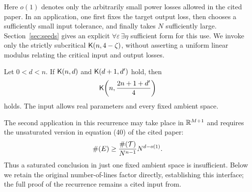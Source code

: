 Here $o(1)$ denotes only the arbitrarily small power losses allowed in the cited paper.
In an application, one first fixes the target output loss, then chooses a sufficiently small input tolerance, and finally takes $N$ sufficiently large.
Section~\ref{sec:seeds} gives an explicit $\forall\varepsilon\,\exists\eta$ sufficient form for this use.
We invoke only the strictly subcritical $\mathsf K(n,4-\zeta)$, without asserting a uniform linear modulus relating the critical input and output losses.

\begin{inputthm}\label{input:KT}
Let $0<d<n$. If $\mathsf K(n,d)$ and $\mathsf K(d+1,d')$ hold, then
\begin{equation}\label{eq:KT}
  \mathsf K\!\left(n,\frac{2n+1+d'}4\right)
\end{equation}
holds. The input allows real parameters and every fixed ambient space.
\end{inputthm}

The second application in this recurrence may take place in $\mathbb R^{M+1}$ and requires the unsaturated version in equation (40) of the cited paper:
\begin{equation}\label{eq:KT-unsaturated}
  \#\!\left(E\right)\ge
  \frac{\#\!\left(\mathcal T\right)}{N^{n-1}}N^{d-o(1)}.
\end{equation}
Thus a saturated conclusion in just one fixed ambient space is insufficient.
Below we retain the original number-of-lines factor directly, establishing this interface;
the full proof of the recurrence remains a cited input from\cite{KT}.
